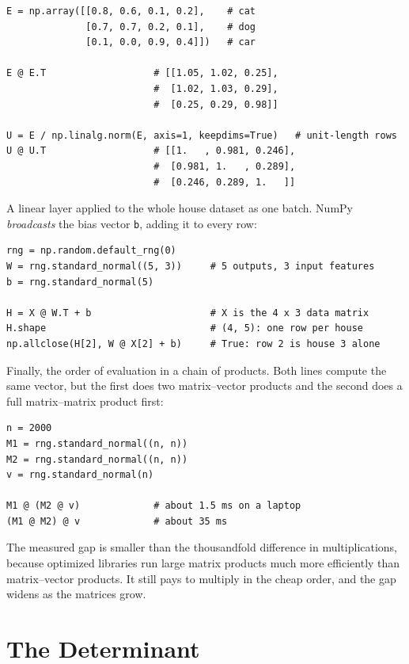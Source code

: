 \begin{lstlisting}
E = np.array([[0.8, 0.6, 0.1, 0.2],    # cat
              [0.7, 0.7, 0.2, 0.1],    # dog
              [0.1, 0.0, 0.9, 0.4]])   # car

E @ E.T                   # [[1.05, 1.02, 0.25],
                          #  [1.02, 1.03, 0.29],
                          #  [0.25, 0.29, 0.98]]

U = E / np.linalg.norm(E, axis=1, keepdims=True)   # unit-length rows
U @ U.T                   # [[1.   , 0.981, 0.246],
                          #  [0.981, 1.   , 0.289],
                          #  [0.246, 0.289, 1.   ]]
\end{lstlisting}

A linear layer applied to the whole house dataset as one batch. NumPy
\emph{broadcasts} the bias vector \texttt{b}, adding it to every row:

\begin{lstlisting}
rng = np.random.default_rng(0)
W = rng.standard_normal((5, 3))     # 5 outputs, 3 input features
b = rng.standard_normal(5)

H = X @ W.T + b                     # X is the 4 x 3 data matrix
H.shape                             # (4, 5): one row per house
np.allclose(H[2], W @ X[2] + b)     # True: row 2 is house 3 alone
\end{lstlisting}

Finally, the order of evaluation in a chain of products. Both lines
compute the same vector, but the first does two matrix--vector products
and the second does a full matrix--matrix product first:

\begin{lstlisting}
n = 2000
M1 = rng.standard_normal((n, n))
M2 = rng.standard_normal((n, n))
v = rng.standard_normal(n)

M1 @ (M2 @ v)             # about 1.5 ms on a laptop
(M1 @ M2) @ v             # about 35 ms
\end{lstlisting}

The measured gap is smaller than the thousandfold difference in
multiplications, because optimized libraries run large matrix products
much more efficiently than matrix--vector products. It still pays to
multiply in the cheap order, and the gap widens as the matrices grow.

\section{The Determinant}
\label{sec:ch03-det}


